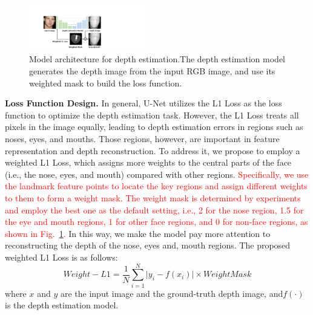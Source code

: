 \begin{figure}[!t]
	\centering
	\includegraphics[width=0.47\textwidth]{figures/model_architecture_1.pdf} 
	\vspace{-0.15in}
	\caption{Model architecture for depth estimation.The depth estimation model generates the depth image from the input RGB image, and use its weighted mask to build the loss function.}
	\label{model_architecture}
	\vspace{-0.15in}
\end{figure}

\textbf{Loss Function Design.} In general, U-Net utilizes the L1 Loss as the loss function to optimize the depth estimation task. However, the L1 Loss treats all pixels in the image equally, leading to depth estimation errors in  regions such as  noses, eyes, and mouths. Those regions, however, are important in feature representation and depth reconstruction.  To address it, we propose to employ a weighted L1 Loss, which assigns more weights to the central parts of the face (i.e., the nose, eyes, and mouth) compared with other regions. 
\textcolor{red}{Specifically, we use the landmark feature points to locate the key regions and assign different weights to them to form a weight mask. 
The weight mask is determined by experiments and employ the best one as the default setting, i.e., 2 for the nose region, 1.5 for the eye and mouth regions, 1 for other face regions, and 0 for non-face regions, as shown in Fig.~\ref{model_architecture}.}
In this way, we make the model pay more attention to reconstructing the depth of the nose, eyes and, mouth regions. 
The proposed weighted L1 Loss is as follows:
\begin{equation}
	Weight{-}L1=\frac{1}{N}\sum_{i=1}^{N} \lvert y_i - f(x_i) \rvert \times WeightMask
	\label{weigted_loss}
\end{equation}
where $x$ and $y$ are the input image and the ground-truth depth image,  and$f(\cdot)$ is the depth estimation model.

